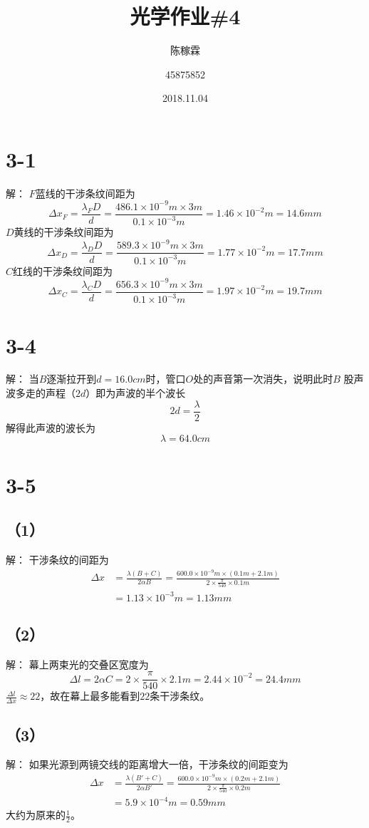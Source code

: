 \documentclass[10pt,a4paper]{article}
\title{光学作业\#4}
\author{陈稼霖 \and 45875852}
\date{2018.11.04}
\begin{document}
\maketitle
\section*{3-1}解：
$F$蓝线的干涉条纹间距为
\[
\Delta x_F = \frac{\lambda_FD}{d} = \frac{486.1\times10^{-9}m\times3m}{0.1\times10^{-3}m} = 1.46\times10^{-2}m = 14.6mm
\]
$D$黄线的干涉条纹间距为
\[
\Delta x_D = \frac{\lambda_DD}{d} = \frac{589.3\times10^{-9}m\times3m}{0.1\times10^{-3}m} = 1.77\times10^{-2}m = 17.7mm
\]
$C$红线的干涉条纹间距为
\[
\Delta x_C = \frac{\lambda_CD}{d} = \frac{656.3\times10^{-9}m\times3m}{0.1\times10^{-3}m} = 1.97\times10^{-2}m = 19.7mm
\]
\section*{3-4}解：
当$B$逐渐拉开到$d = 16.0cm$时，管口$O$处的声音第一次消失，说明此时$B$ 股声波多走的声程（$2d$）即为声波的半个波长
\[
2d = \frac{\lambda}{2}
\]
解得此声波的波长为
\[
\lambda  = 64.0cm
\]
\section*{3-5}
\subsection*{（1）}解：
干涉条纹的间距为
\begin{align*}
\Delta x &= \frac{\lambda(B + C)}{2\alpha B} = \frac{600.0\times10^{-9}m\times(0.1m + 2.1m)}{2\times\frac{\pi}{540}\times0.1m}\\
&= 1.13\times10^{-3}m = 1.13mm
\end{align*}
\subsection*{（2）}解：
幕上两束光的交叠区宽度为
\[
\Delta l = 2\alpha C = 2\times\frac{\pi}{540}\times2.1m = 2.44\times10^{-2} = 24.4mm
\]
$\frac{\Delta l}{\Delta x} \approx 22$，故在幕上最多能看到$22$条干涉条纹。
\subsection*{（3）}解：
如果光源到两镜交线的距离增大一倍，干涉条纹的间距变为
\begin{align*}
\Delta x &= \frac{\lambda(B' + C)}{2\alpha B'} = \frac{600.0\times10^{-9}m\times(0.2m + 2.1m)}{2\times\frac{\pi}{540}\times0.2m}\\
&= 5.9\times10^{-4}m = 0.59mm
\end{align*}
大约为原来的$\frac{1}{2}$。
\end{document}

